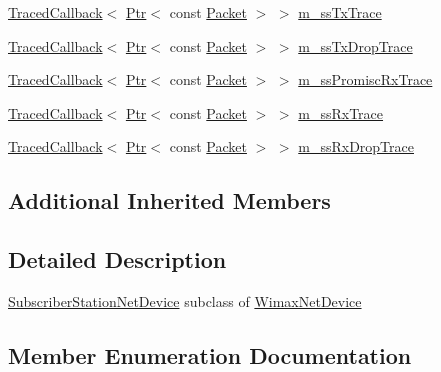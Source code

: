 \begin{DoxyCompactItemize}
\hyperlink{classns3_1_1TracedCallback}{Traced\+Callback}$<$ \hyperlink{classns3_1_1Ptr}{Ptr}$<$ const \hyperlink{classns3_1_1Packet}{Packet} $>$ $>$ \hyperlink{classns3_1_1SubscriberStationNetDevice_ae35c70c971bddab696265db0c4f85331}{m\+\_\+ss\+Tx\+Trace}
\item 
\hyperlink{classns3_1_1TracedCallback}{Traced\+Callback}$<$ \hyperlink{classns3_1_1Ptr}{Ptr}$<$ const \hyperlink{classns3_1_1Packet}{Packet} $>$ $>$ \hyperlink{classns3_1_1SubscriberStationNetDevice_a8eb77ccf96f4d45b40bc9498be58df47}{m\+\_\+ss\+Tx\+Drop\+Trace}
\item 
\hyperlink{classns3_1_1TracedCallback}{Traced\+Callback}$<$ \hyperlink{classns3_1_1Ptr}{Ptr}$<$ const \hyperlink{classns3_1_1Packet}{Packet} $>$ $>$ \hyperlink{classns3_1_1SubscriberStationNetDevice_a2c670d0f51aa369b4e786c8112b2f7ea}{m\+\_\+ss\+Promisc\+Rx\+Trace}
\item 
\hyperlink{classns3_1_1TracedCallback}{Traced\+Callback}$<$ \hyperlink{classns3_1_1Ptr}{Ptr}$<$ const \hyperlink{classns3_1_1Packet}{Packet} $>$ $>$ \hyperlink{classns3_1_1SubscriberStationNetDevice_a88c8f706dea73606f68daa73703f65b5}{m\+\_\+ss\+Rx\+Trace}
\item 
\hyperlink{classns3_1_1TracedCallback}{Traced\+Callback}$<$ \hyperlink{classns3_1_1Ptr}{Ptr}$<$ const \hyperlink{classns3_1_1Packet}{Packet} $>$ $>$ \hyperlink{classns3_1_1SubscriberStationNetDevice_aa8ecbe05da5dcc544b94a2965cabdb9f}{m\+\_\+ss\+Rx\+Drop\+Trace}
\end{DoxyCompactItemize}
\subsection*{Additional Inherited Members}


\subsection{Detailed Description}
\hyperlink{classns3_1_1SubscriberStationNetDevice}{Subscriber\+Station\+Net\+Device} subclass of \hyperlink{classns3_1_1WimaxNetDevice}{Wimax\+Net\+Device} 

\subsection{Member Enumeration Documentation}
